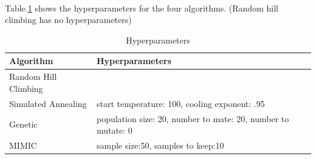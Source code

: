 \documentclass[11pt]{article}
\begin{document}
\\Table.\ref{tab:hy_count} shows the hyperparameters for the four algorithms. (Random hill climbing has no hyperparameters)
\begin{table}[h!]
  \begin{center}
    \caption{Hyperparameters}
    \label{tab:hy_count}
    \begin{tabular}{l|l}
      \textbf{Algorithm} & \textbf{Hyperparameters}\\
      \hline
      Random Hill Climbing & \\
      Simulated Annealing &  start temperature: 100, cooling exponent: .95\\
      Genetic & population size: 20, number to mate: 20, number to mutate: 0\\
      MIMIC & sample size:50, samples to keep:10\\
    \end{tabular}
  \end{center}
\end{table}
\end{document}
